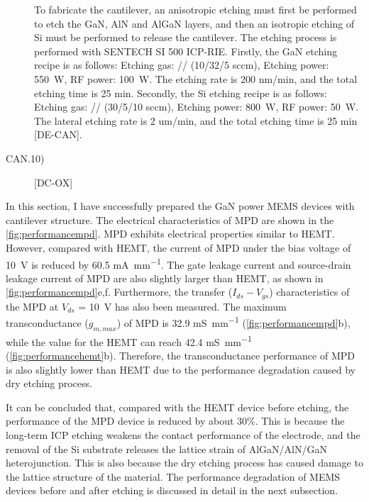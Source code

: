 \begin{description}
	 To  fabricate the  cantilever, an anisotropic etching  must first be performed to etch the GaN, AlN and AlGaN layers, and then an isotropic  etching of Si must be performed to release the cantilever. The etching process is performed with SENTECH SI 500 ICP-RIE. Firstly, the GaN etching recipe is as follows: Etching gas: // (10/32/5 sccm), Etching power: \SI{550}{\watt}, RF power: \SI{100}{\watt}. The etching rate is 200 \unit{nm/min}, and the total etching time is 25 min. Secondly, the Si etching recipe is as follows: Etching gas: // (30/5/10 sccm), Etching power: \SI{800}{\watt}, RF power: \SI{50}{\watt}. The lateral etching rate is 2 \unit{um/min}, and the total etching time is 25 min [DE-CAN].
	 
	 \item[CAN.10)] [DC-OX]	

\end{description}

In this section, I have successfully prepared the GaN power  MEMS devices with cantilever  structure. The electrical characteristics of MPD are shown in the \autoref{fig:performancempd}. MPD  exhibits electrical properties similar to  HEMT. However, compared with HEMT, the current of MPD under the bias voltage of \SI{10}{\volt} is reduced by 60.5 \unit{\mA\per\mm}. The gate leakage current  and source-drain leakage current of MPD are also slightly larger than HEMT, as shown in \autoref{fig:performancempd}e,f. Furthermore, the transfer ($I_{ds}-V_{gs}$) characteristics of the MPD at $V_{ds}$ = \SI{10}{\volt} has also been measured. The maximum transconductance  ($g_{m, max}$) of MPD is 32.9 \unit{\milli\siemens\per\mm} (\autoref{fig:performancempd}b), while the value for the HEMT can reach 42.4 \unit{\milli\siemens\per\mm} (\autoref{fig:performancehemt}b). Therefore, the transconductance performance of MPD is also slightly lower than HEMT due to the performance degradation  caused by dry etching process. 

It can be concluded that, compared with the HEMT device before etching, the performance of the MPD device is reduced by about 30$\%$. This is because the long-term ICP  etching weakens the contact performance of the  electrode, and the removal of the Si  substrate releases the lattice strain  of AlGaN/AlN/GaN  heterojunction. This is also because the dry etching  process has caused damage to the lattice structure of the material. The performance degradation  of MEMS devices before and after etching is discussed in detail in the  next  subsection.

